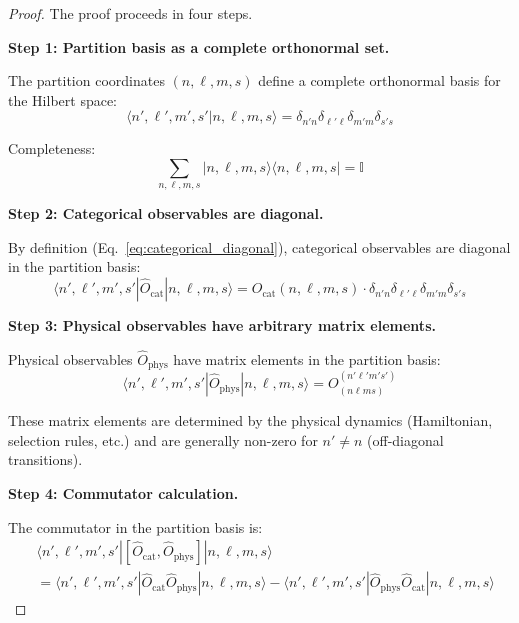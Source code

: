 \documentclass[twocolumn,10pt]{article}
\theoremstyle{remark}
\begin{document}
\begin{proof}
The proof proceeds in four steps.

\textbf{Step 1: Partition basis as a complete orthonormal set.}

The partition coordinates $(n, \ell, m, s)$ define a complete orthonormal basis for the Hilbert space:
\begin{equation}
    \langle n', \ell', m', s' | n, \ell, m, s \rangle = \delta_{n'n} \delta_{\ell'\ell} \delta_{m'm} \delta_{s's}
    \label{eq:partition_orthonormality}
\end{equation}

Completeness:
\begin{equation}
    \sum_{n, \ell, m, s} |n, \ell, m, s\rangle \langle n, \ell, m, s| = \mathbb{I}
    \label{eq:partition_completeness}
\end{equation}

\textbf{Step 2: Categorical observables are diagonal.}

By definition (Eq.~\ref{eq:categorical_diagonal}), categorical observables are diagonal in the partition basis:
\begin{equation}
    \langle n', \ell', m', s' | \hat{O}_{\text{cat}} | n, \ell, m, s \rangle = O_{\text{cat}}(n, \ell, m, s) \cdot \delta_{n'n} \delta_{\ell'\ell} \delta_{m'm} \delta_{s's}
    \label{eq:categorical_matrix_elements}
\end{equation}

\textbf{Step 3: Physical observables have arbitrary matrix elements.}

Physical observables $\hat{O}_{\text{phys}}$ have matrix elements in the partition basis:
\begin{equation}
    \langle n', \ell', m', s' | \hat{O}_{\text{phys}} | n, \ell, m, s \rangle = O^{(n'\ell'm's')}_{(n\ell ms)}
    \label{eq:physical_matrix_elements}
\end{equation}

These matrix elements are determined by the physical dynamics (Hamiltonian, selection rules, etc.) and are generally non-zero for $n' \neq n$ (off-diagonal transitions).

\textbf{Step 4: Commutator calculation.}

The commutator in the partition basis is:
\begin{align}
    &\langle n', \ell', m', s' | [\hat{O}_{\text{cat}}, \hat{O}_{\text{phys}}] | n, \ell, m, s \rangle \nonumber \\
    &= \langle n', \ell', m', s' | \hat{O}_{\text{cat}} \hat{O}_{\text{phys}} | n, \ell, m, s \rangle - \langle n', \ell', m', s' | \hat{O}_{\text{phys}} \hat{O}_{\text{cat}} | n, \ell, m, s \rangle \label{eq:commutator_expansion}
\end{align}


\end{proof}
\end{document}
